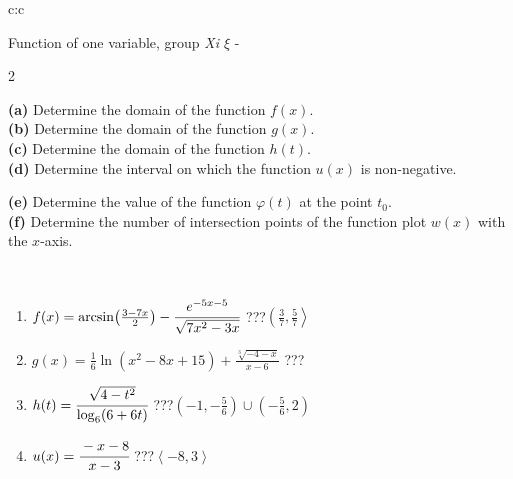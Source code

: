 \documentclass[10pt]{report}
\begin{document}
\begin{tabular}{c:c}
\begin{minipage}[c][104.5mm][t]{0.5\linewidth}
\begin{center}
\vspace{7mm}
{\huge Function of one variable, group \textit{Xi $\xi$} -}\\[5mm]
\begin{minipage}{0.95\linewidth}
\begin{center}
{\small \begin{multicols}{2} \raggedright
\textbf{(a)} Determine the domain of the function \(f(x)\). \\[1mm]
\textbf{(b)} Determine the domain of the function \(g(x)\). \\[1mm]
\textbf{(c)} Determine the domain of the function \(h(t)\). \\[1mm]
\textbf{(d)} Determine the interval on which the function \(u(x)\) is non-negative. \par \columnbreak
\textbf{(e)} Determine the value of the function \(\varphi(t)\) at the point \(t_0\). \\[1mm]
\textbf{(f)} Determine the number of intersection points of the function plot \(w(x)\) with the \(x\)-axis. \\[1mm]
\end{multicols}
}
\end{center}
\end{minipage}
\\[4mm]
\begin{minipage}{0.79\linewidth}
\begin{center}
\begin{varwidth}{\linewidth}
\begin{enumerate}
\small
\item $f(x) = \arcsin\!\left( \frac{3-7x}{2} \right) - \cfrac{e^{-5x-5}}{\sqrt{7x^2-3x}}$\quad \dotfill\; ???\;\dotfill \quad $\left(\frac{3}{7} , \frac{5}{7}\right\rangle$
\item $g(x) = \frac{1}{6} \ln{\!(x^2-8x+15)}+\frac{\sqrt[3]{-4-x}}{x-6}$\quad \dotfill\; ???\;\dotfill {}
\item $h(t) = \cfrac{\sqrt{4-t^2}}{\log_6(6+6t)}$\quad \dotfill\; ???\;\dotfill \quad $\left(-1 , -\frac{5}{6}\right)\cup\left(-\frac{5}{6} , 2\right)$
\item $u(x) = \cfrac{-x-8}{x-3}$\quad \dotfill\; ???\;\dotfill \quad $\left\langle-8 , 3\right\rangle$

\end{enumerate}
\end{varwidth}
\end{center}
\end{minipage}
\end{center}
\end{minipage}
\end{tabular}
\end{document}
